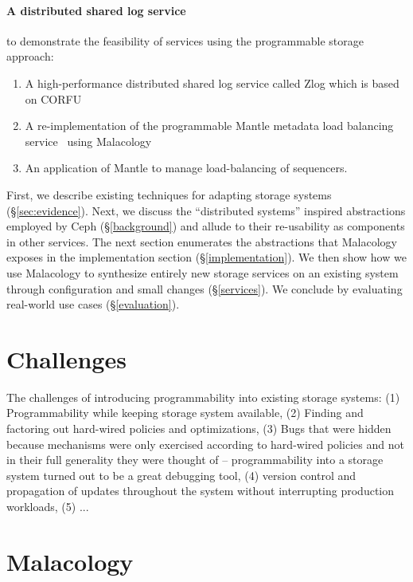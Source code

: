 \documentclass[10pt,twocolumn]{article}
\begin{document}
\paragraph*{A distributed shared log service} to demonstrate the feasibility of services using the programmable storage approach:

  \begin{enumerate}
  \item
    A high-performance distributed shared log service called Zlog which is based on CORFU~\cite{balakrishnan_corfu_2012}
  \item
    A re-implementation of the programmable Mantle metadata load balancing service~\cite{sevilla:sc15-mantle} using Malacology
  \item 
    An application of Mantle to manage load-balancing of sequencers.
  \end{enumerate}

First, we describe existing techniques for adapting storage systems
(\S\ref{sec:evidence}). Next, we discuss the ``distributed systems'' inspired
abstractions employed by Ceph (\S\ref{background}) and allude to their
re-usability as components in other services. The next section
enumerates the abstractions that Malacology exposes in the
implementation section (\S\ref{implementation}). We then show how we use
Malacology to synthesize entirely new storage services on an existing
system through configuration and small changes (\S\ref{services}). We
conclude by evaluating real-world use cases (\S\ref{evaluation}).

\section{Challenges}
\label{sec:challenges}

The challenges of introducing programmability into existing storage systems: (1) Programmability while keeping storage system available, (2) Finding and factoring out hard-wired policies and optimizations, (3) Bugs that were hidden because mechanisms were only exercised according to hard-wired policies and not in their full generality they were thought of -- programmability into a storage system turned out to be a great debugging tool, (4) version control and propagation of updates throughout the system without interrupting production workloads, (5) ...

\section{Malacology}
\label{sec:malacology}
\end{document}
